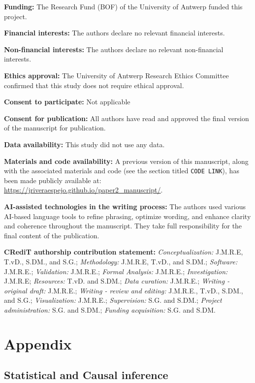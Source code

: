 \documentclass[
  authoryear,
  review,
  1p]{elsarticle}
\begin{document}
\textbf{Funding:} The Research Fund (BOF) of the University of Antwerp
funded this project.

\textbf{Financial interests:} The authors declare no relevant financial
interests.

\textbf{Non-financial interests:} The authors declare no relevant
non-financial interests.

\textbf{Ethics approval:} The University of Antwerp Research Ethics
Committee confirmed that this study does not require ethical approval.

\textbf{Consent to participate:} Not applicable

\textbf{Consent for publication:} All authors have read and approved the
final version of the manuscript for publication.

\textbf{Data availability:} This study did not use any data.

\textbf{Materials and code availability:} A previous version of this
manuscript, along with the associated materials and code (see the
section titled \texttt{CODE\ LINK}), has been made publicly available
at: \url{https://jriveraespejo.github.io/paper2_manuscript/}.

\textbf{AI-assisted technologies in the writing process:} The authors
used various AI-based language tools to refine phrasing, optimize
wording, and enhance clarity and coherence throughout the manuscript.
They take full responsibility for the final content of the publication.

\textbf{CRediT authorship contribution statement:}
\emph{Conceptualization:} J.M.R.E, T.vD., S.DM., and S.G.;
\emph{Methodology:} J.M.R.E, T.vD., and S.DM.; \emph{Software:}
J.M.R.E.; \emph{Validation:} J.M.R.E.; \emph{Formal Analysis:} J.M.R.E.;
\emph{Investigation:} J.M.R.E; \emph{Resources:} T.vD. and S.DM.;
\emph{Data curation:} J.M.R.E.; \emph{Writing - original draft:}
J.M.R.E.; \emph{Writing - review and editing:} J.M.R.E., T.vD., S.DM.,
and S.G.; \emph{Visualization:} J.M.R.E.; \emph{Supervision:} S.G. and
S.DM.; \emph{Project administration:} S.G. and S.DM.; \emph{Funding
acquisition:} S.G. and S.DM.

\newpage{}

\section{Appendix}\label{sec-appendix}

\subsection{Statistical and Causal inference}\label{sec-appendixB}
\end{document}
